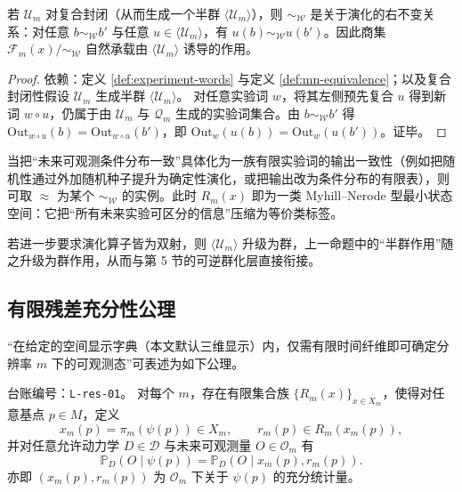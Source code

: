 \begin{proposition}[右不变性与商结构]\label{prop:mn-right-congruence}
若 $\mathcal U_m$ 对复合封闭（从而生成一个半群 $\langle\mathcal U_m\rangle$），则 $\sim_{\mathcal W}$ 是关于演化的右不变关系：对任意 $b\sim_{\mathcal W} b'$ 与任意 $u\in\langle\mathcal U_m\rangle$，有 $u(b)\sim_{\mathcal W} u(b')$。因此商集 $\mathcal F_m(x)/{\sim_{\mathcal W}}$ 自然承载由 $\langle\mathcal U_m\rangle$ 诱导的作用。
\end{proposition}

\begin{proof}
\MathTag 依赖：定义 \ref{def:experiment-words} 与定义 \ref{def:mn-equivalence}；以及复合封闭性假设 $\mathcal U_m$ 生成半群 $\langle\mathcal U_m\rangle$。
对任意实验词 $w$，将其左侧预先复合 $u$ 得到新词 $w\circ u$，仍属于由 $\mathcal U_m$ 与 $\mathcal Q_m$ 生成的实验词集合。由 $b\sim_{\mathcal W} b'$ 得 $\mathrm{Out}_{w\circ u}(b)=\mathrm{Out}_{w\circ u}(b')$，即 $\mathrm{Out}_{w}(u(b))=\mathrm{Out}_{w}(u(b'))$。证毕。
\end{proof}

\begin{remark}
当把“未来可观测条件分布一致”具体化为一族有限实验词的输出一致性（例如把随机性通过外加随机种子提升为确定性演化，或把输出改为条件分布的有限表），则可取 $\approx$ 为某个 $\sim_{\mathcal W}$ 的实例。此时 $R_m(x)$ 即为一类 Myhill--Nerode 型最小状态空间：它把“所有未来实验可区分的信息”压缩为等价类标签。\par

若进一步要求演化算子皆为双射，则 $\langle\mathcal U_m\rangle$ 升级为群，上一命题中的“半群作用”随之升级为群作用，从而与第 5 节的可逆群化层直接衔接。
\end{remark}

\subsection{有限残差充分性公理}

“在给定的空间显示字典（本文默认三维显示）内，仅需有限时间纤维即可确定分辨率 $m$ 下的可观测态”可表述为如下公理。

\begin{axiom}[有限残差充分性]\label{ax:finite_residual_sufficiency}
\InterfaceTag
\AuditTag 台账编号：\texttt{L-res-01}。
对每个 $m$，存在有限集合族 $\{R_m(x)\}_{x\in X_m}$，使得对任意基点 $p\in M$，定义
$$
x_m(p)=\pi_m(\psi(p))\in X_m,\qquad r_m(p)\in R_m(x_m(p)),
$$
并对任意允许动力学 $D\in\mathcal D$ 与未来可观测量 $O\in \mathcal O_m$ 有
$$
\mathbb{P}_D\left(O\mid \psi(p)\right)=\mathbb{P}_D\left(O\mid x_m(p),r_m(p)\right).
$$
亦即 $(x_m(p),r_m(p))$ 为 $\mathcal O_m$ 下关于 $\psi(p)$ 的充分统计量。
\end{axiom}


